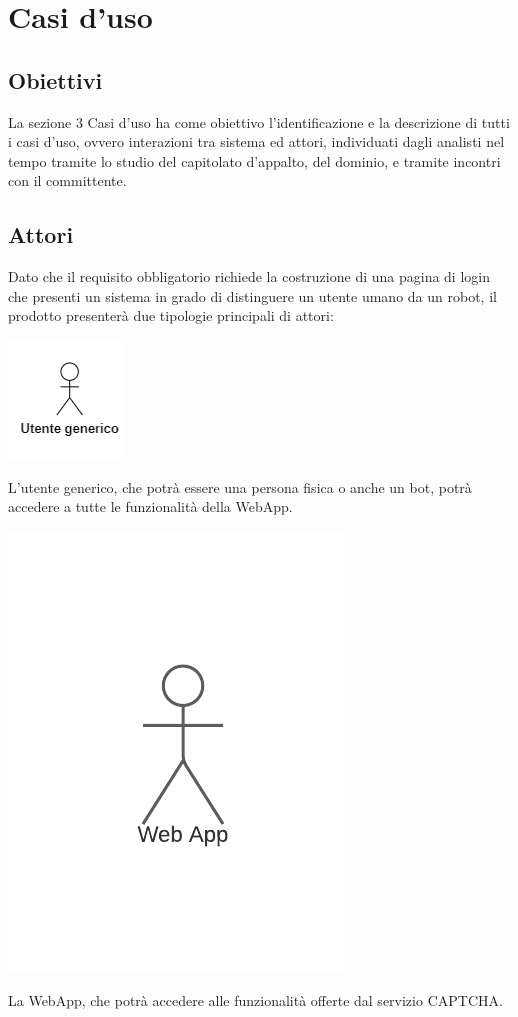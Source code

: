 \section{Casi d'uso}

\subsection{Obiettivi}
La sezione 3 Casi d'uso ha come obiettivo l'identificazione e la descrizione di tutti i casi d'uso, ovvero interazioni tra sistema ed attori, individuati dagli analisti nel tempo tramite lo studio del capitolato d'appalto, del dominio, e tramite incontri con il committente.

\subsection{Attori}
Dato che il requisito obbligatorio richiede la costruzione di una pagina di login che presenti un sistema in grado di distinguere un utente umano da un robot, il prodotto presenterà due tipologie principali di attori:
\begin{center}
\includegraphics[scale = 1]{img/utente_generico.png}\\
\end{center}
L'utente generico, che potrà essere una persona fisica o anche un bot, potrà accedere a tutte le funzionalità della WebApp. \\
\begin{center}
\includegraphics[scale = 1]{img/webapp.png}\\
\end{center}
La WebApp, che potrà accedere alle funzionalità offerte dal servizio CAPTCHA. \\

